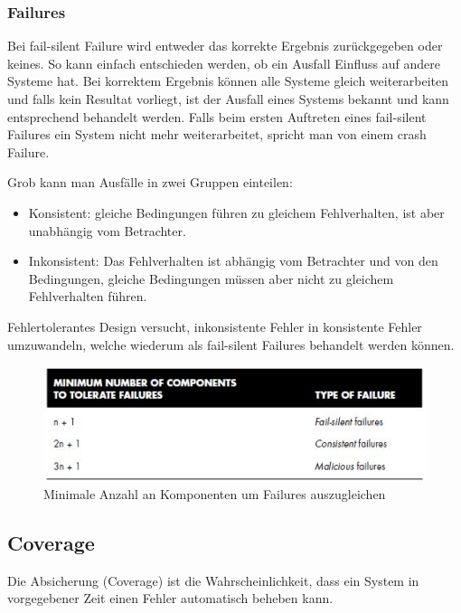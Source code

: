 \subsubsection*{Failures}
 Bei fail-silent Failure wird entweder das korrekte Ergebnis zurückgegeben oder keines. So kann einfach entschieden werden, ob ein Ausfall Einfluss auf andere Systeme hat. Bei korrektem Ergebnis können alle Systeme gleich weiterarbeiten und falls kein Resultat vorliegt, ist der Ausfall eines Systems bekannt und kann entsprechend behandelt werden. Falls beim ersten Auftreten eines fail-silent Failures ein System nicht mehr weiterarbeitet, spricht man von einem crash Failure.

Grob kann man Ausfälle in zwei Gruppen einteilen:

\begin{itemize}
    \item Konsistent: gleiche Bedingungen führen zu gleichem Fehlverhalten, ist aber unabhängig vom Betrachter.
    \item Inkonsistent: Das Fehlverhalten ist abhängig vom Betrachter und von den Bedingungen, gleiche Bedingungen müssen aber nicht zu gleichem Fehlverhalten führen.
\end{itemize}

Fehlertolerantes Design versucht, inkonsistente Fehler in konsistente Fehler umzuwandeln, welche wiederum als fail-silent Failures behandelt werden können.

\begin{figure}[H]
	\centering
	\includegraphics[width=\textwidth]{content/faulttolerance/images/failure-redundancy-num-components.jpg}
	\caption{Minimale Anzahl an Komponenten um Failures auszugleichen}
\end{figure}

\subsection{Coverage}
 Die Absicherung (Coverage) ist die Wahrscheinlichkeit, dass ein System in vorgegebener Zeit einen Fehler automatisch beheben kann.

